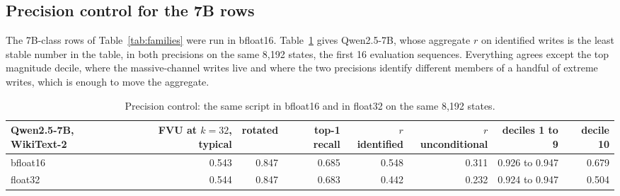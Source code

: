 \subsection{Precision control for the 7B rows}\label{app:fp32}
The 7B-class rows of Table~\ref{tab:families} were run in bfloat16. Table~\ref{app:fp32-table} gives Qwen2.5-7B, whose aggregate $r$ on identified writes is the least stable number in the table, in both precisions on the same 8{,}192 states, the first 16 evaluation sequences. Everything agrees except the top magnitude decile, where the massive-channel writes live and where the two precisions identify different members of a handful of extreme writes, which is enough to move the aggregate.
\begin{table}[H]\centering\scriptsize
\caption{Precision control: the same script in bfloat16 and in float32 on the same 8{,}192 states.}\label{app:fp32-table}
\begin{adjustbox}{max width=\linewidth}
\begin{tabular}{lrrrrrrr}\toprule
Qwen2.5-7B, WikiText-2 & FVU at $k=32$, typical & rotated & top-1 recall & $r$ identified & $r$ unconditional & deciles 1 to 9 & decile 10 \\ \midrule
bfloat16 & 0.543 & 0.847 & 0.685 & 0.548 & 0.311 & 0.926 to 0.947 & 0.679 \\
float32 & 0.544 & 0.847 & 0.683 & 0.442 & 0.232 & 0.924 to 0.947 & 0.504 \\
\bottomrule\end{tabular}\end{adjustbox}
\end{table}

